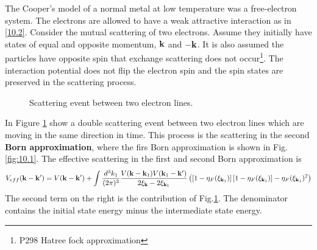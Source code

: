 The Cooper's model of a normal metal at low temperature was a free-electron system.
The electrons are allowed to have a weak attractive interaction as in \eqref{10.2}.
Consider the mutual scattering of two electrons.
Assume they initially have states of equal and opposite momentum, $\mathbf{k}$ and $-\mathbf{k}$.
It is also assumed the particles have opposite spin that exchange scattering does not occur\footnote{P298 Hatree fock approximation}.
The interaction potential does not flip the electron spin and the spin states are preserved in the scattering process.

\begin{figure}[ht]
    \centering
    \caption{Scattering event between two electron lines.}%
    \label{fig:10.2}
\end{figure}
In Figure \ref{fig:10.2} show a double scattering event between two electron lines which are moving in the same direction in time.
This process is the scattering in the second \textbf{Born approximation}, where the firs Born approximation is shown in Fig.\ref{fig:10.1}.
The effective scattering in the first and second Born approximation is
\begin{equation}
    V_{eff}(\mathbf{k}-\mathbf{k}') = V(\mathbf{k}-\mathbf{k}') + \int \frac{d^3 k_1}{(2\pi)^3} \frac{V(\mathbf{k}-\mathbf{k}_1) V(\mathbf{k}_1- \mathbf{k}')}{2\xi_{\mathbf{k}} - 2 \xi_{\mathbf{k}_1}} \left( \left[1-\eta_F(\xi_{\mathbf{k}_1}) \right] \left[ 1- \eta_F(\xi_{\mathbf{k}_1}) \right] - \eta_F(\xi_{\mathbf{k}_1})^2 \right)   \label{10.3}
\end{equation}
The second term on the right is the contribution of Fig.\ref{fig:10.2}.
The denominator contains the initial state energy minus the intermediate state energy.
